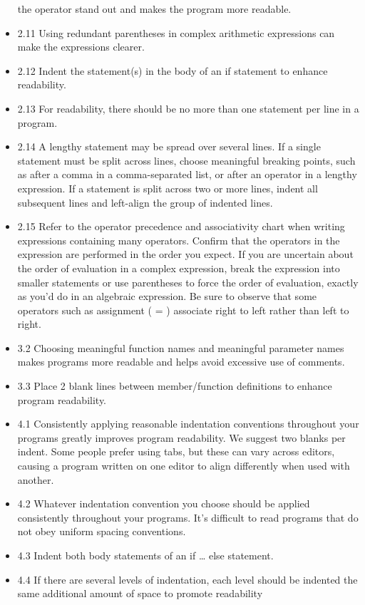 \documentclass[11pt]{article}
\begin{document}
\begin{itemize}
the operator stand out and makes the program more readable.
\item 2.11 Using redundant parentheses in complex arithmetic expressions
can make the expressions clearer.
\item 2.12 Indent the statement(s) in the body of an if statement to
enhance readability.
\item 2.13 For readability, there should be no more than one statement per
line in a program.
\item 2.14 A lengthy statement may be spread over several lines. If a
single statement must be split across lines, choose meaningful
breaking points, such as after a comma in a comma-separated list, or
after an operator in a lengthy expression. If a statement is split
across two or more lines, indent all subsequent lines and left-align
the group of indented lines.
\item 2.15 Refer to the operator precedence and associativity chart when
writing expressions containing many operators. Confirm that the
operators in the expression are performed in the order you
expect. If you are uncertain about the order of evaluation in a
complex expression, break the expression into smaller statements or
use parentheses to force the order of evaluation, exactly as you’d
do in an algebraic expression. Be sure to observe that some
operators such as assignment ( = ) associate right to left rather
than left to right.
\item 3.2 Choosing meaningful function names and meaningful parameter
names makes programs more readable and helps avoid excessive use of
comments.
\item 3.3 Place 2 blank lines between member/function definitions to
enhance program readability.
\item 4.1 Consistently applying reasonable indentation conventions
throughout your programs greatly improves program readability. We
suggest two blanks per indent. Some people prefer using tabs, but
these can vary across editors, causing a program written on one
editor to align differently when used with another.
\item 4.2 Whatever indentation convention you choose should be applied
consistently throughout your programs. It’s difficult to read
programs that do not obey uniform spacing conventions.
\item 4.3 Indent both body statements of an if \ldots{} else statement.
\item 4.4 If there are several levels of indentation, each level should be
indented the same additional amount of space to promote readability

\end{itemize}
\end{document}
